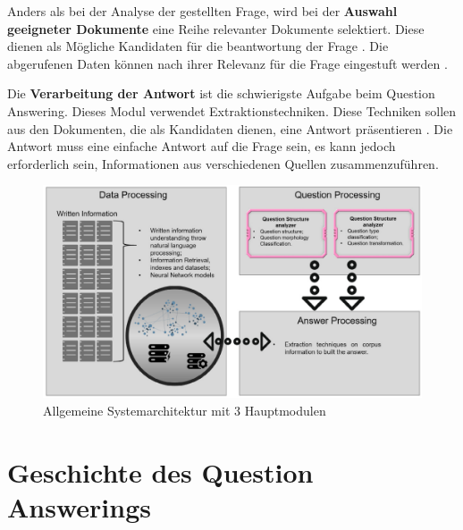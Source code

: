 \documentclass[
        ngerman,
        paper=a4,
        numbers=noendperiod,
]{scrreprt}
\begin{document}
Anders als bei der Analyse der gestellten Frage, wird bei der \textbf{Auswahl geeigneter Dokumente} eine Reihe relevanter Dokumente selektiert. Diese dienen als Mögliche Kandidaten für die beantwortung der Frage \cite{Malik2013DomainSystem}. Die abgerufenen Daten können nach ihrer Relevanz für die Frage eingestuft werden \citep{Neves2015QuestionBiology}. 

Die \textbf{Verarbeitung der Antwort} ist die schwierigste Aufgabe beim Question Answering. Dieses Modul verwendet Extraktionstechniken. Diese Techniken sollen aus den Dokumenten, die als Kandidaten dienen, eine Antwort präsentieren \citep{Bhoir2014QuestionApproach}. Die Antwort muss eine einfache Antwort auf die Frage sein, es kann jedoch erforderlich sein, Informationen aus verschiedenen Quellen zusammenzuführen.

\begin{figure}[H]
    \centering\includegraphics[width=1\linewidth]{images/arch.png}
    \caption[Allgemeine Systemarchitektur mit 3 Hauptmodulen]{Allgemeine Systemarchitektur mit 3 Hauptmodulen \cite [S. 3]{CalijorneSoares2018ASystems}}
    \label{fig:architektur}
\end{figure}
\section{Geschichte des Question Answerings}

%
\end{document}
